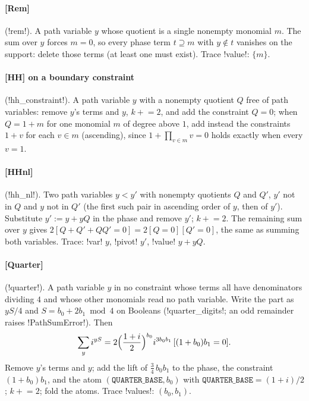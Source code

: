 \paragraph{[Rem]} (\code!rem!). A path variable $y$ whose quotient is a single nonempty monomial $m$. The sum over $y$ forces $m=0$, so every phase term $t\supseteq m$ with $y\notin t$ vanishes on the support: delete those terms (at least one must exist). Trace \code!value!: $\{m\}$.

\paragraph{[HH] on a boundary constraint} (\code!hh_constraint!). A path variable $y$ with a nonempty quotient $Q$ free of path variables: remove $y$'s terms and $y$, $k\mathrel{+}=2$, and add the constraint $Q=0$; when $Q=1+m$ for one monomial $m$ of degree above $1$, add instead the constraints $1+v$ for each $v\in m$ (ascending), since $1+\prod_{v\in m}v=0$ holds exactly when every $v=1$.

\paragraph{[HHnl]} (\code!hh_nl!). Two path variables $y<y'$ with nonempty quotients $Q$ and $Q'$, $y'$ not in $Q$ and $y$ not in $Q'$ (the first such pair in ascending order of $y$, then of $y'$). Substitute $y':=y+yQ$ in the phase and remove $y'$; $k\mathrel{+}=2$. The remaining sum over $y$ gives $2[Q+Q'+QQ'=0]=2[Q=0][Q'=0]$, the same as summing both variables. Trace: \code!var! $y$, \code!pivot! $y'$, \code!value! $y+yQ$.

\paragraph{[Quarter]} (\code!quarter!). A path variable $y$ in no constraint whose terms all have denominators dividing $4$ and whose other monomials read no path variable. Write the part as $yS/4$ and $S=b_0+2b_1\bmod4$ on Booleans (\py!quarter_digits!; an odd remainder raises \py!PathSumError!). Then
\begin{equation}
\sum_y i^{yS}=2\Bigl(\frac{1+i}{2}\Bigr)^{b_0}i^{3b_0b_1}\,[(1+b_0)b_1=0].
\end{equation}
Remove $y$'s terms and $y$; add the lift of $\tfrac34\,b_0b_1$ to the phase, the constraint $(1+b_0)b_1$, and the atom $(\mathtt{QUARTER\_BASE},b_0)$ with $\mathtt{QUARTER\_BASE}=(1+i)/2$; $k\mathrel{+}=2$; fold the atoms. Trace \code!values!: $(b_0,b_1)$.

